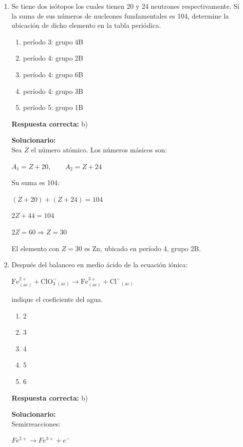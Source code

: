 \begin{enumerate}
	
	\item Se tiene dos isótopos los cuales tienen 20 y 24 neutrones respectivamente. Si la suma de sus números de nucleones fundamentales es 104, determine la ubicación de dicho elemento en la tabla periódica.
	\begin{enumerate}[label=\alph*)]
		\item período 3: grupo 4B
		\item período 4: grupo 2B
		\item período 4: grupo 6B
		\item período 4: grupo 3B
		\item período 5: grupo 1B
	\end{enumerate}
	\textbf{Respuesta correcta:} b)
	
	\vspace{2mm}
	\textbf{Solucionario:}\\
	Sea $Z$ el número atómico. Los números másicos son:
	
	$A_1=Z+20,\qquad A_2=Z+24$
	
	Su suma es 104:
	
	$(Z+20)+(Z+24)=104$
	
	$2Z+44=104$
	
	$2Z=60 \Rightarrow Z=30$
	
	El elemento con $Z=30$ es Zn, ubicado en período 4, grupo 2B.
	
	\vspace{6mm}
	
	\item Después del balanceo en medio ácido de la ecuación iónica:
	
	$\mathrm{Fe^{2+}_{(ac)}+ClO_3^-{}_{(ac)}\rightarrow Fe^{3+}_{(ac)}+Cl^-{}_{(ac)}}$
	
	indique el coeficiente del agua.
	\begin{enumerate}[label=\alph*)]
		\item 2
		\item 3
		\item 4
		\item 5
		\item 6
	\end{enumerate}
	\textbf{Respuesta correcta:} b)
	
	\vspace{2mm}
	\textbf{Solucionario:}\\
	Semirreacciones:
	
	$Fe^{2+}\rightarrow Fe^{3+}+e^-$
	

\end{enumerate}
